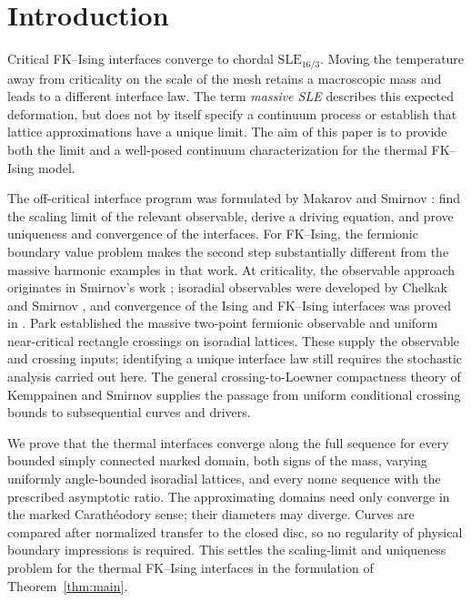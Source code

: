 \section{Introduction}\label{sec:introduction}

Critical FK--Ising interfaces converge to chordal
$\mathrm{SLE}_{16/3}$. Moving the temperature away from criticality
on the scale of the mesh retains a macroscopic mass and leads to a
different interface law. The term \emph{massive SLE} describes this
expected deformation, but does not by itself specify a continuum
process or establish that lattice approximations have a unique
limit. The aim of this paper is to provide both the limit and a
well-posed continuum characterization for the thermal FK--Ising
model.

The off-critical interface program was formulated by Makarov and
Smirnov \cite[Problems~A--B and Section~2.4]{MS}: find the scaling
limit of the relevant observable, derive a driving equation, and
prove uniqueness and convergence of the interfaces. For FK--Ising,
the fermionic boundary value problem makes the second step
substantially different from the massive harmonic examples in that
work. At criticality, the observable approach originates in
Smirnov's work \cite{Smirnov}; isoradial observables were developed
by Chelkak and Smirnov \cite{CS}, and convergence of the Ising and
FK--Ising interfaces was proved in \cite{CDCHKS}. Park
\cite{Park} established the massive two-point fermionic observable
and uniform near-critical rectangle crossings on isoradial
lattices. These supply the observable and crossing inputs; identifying a unique
interface law still requires the stochastic analysis carried out here. The general crossing-to-Loewner compactness
theory of Kemppainen and Smirnov \cite{KS} supplies the passage
from uniform conditional crossing bounds to subsequential curves
and drivers.

We prove that the thermal interfaces converge along the full
sequence for every bounded simply connected marked domain, both
signs of the mass, varying uniformly angle-bounded isoradial
lattices, and every nome sequence with the prescribed asymptotic
ratio. The approximating domains need only converge in the marked
Carath\'eodory sense; their diameters may diverge. Curves are
compared after normalized transfer to the closed disc, so no
regularity of physical boundary impressions is required. This
settles the scaling-limit and uniqueness problem for the thermal
FK--Ising interfaces in the formulation of
Theorem~\ref{thm:main}.

